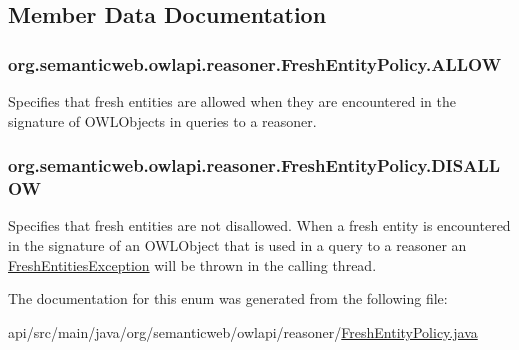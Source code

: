 \subsection{Member Data Documentation}
\hypertarget{enumorg_1_1semanticweb_1_1owlapi_1_1reasoner_1_1_fresh_entity_policy_a8f3d06d4ac09dbdb0e9d8da43e06cfc5}{
\subsubsection[{A\-L\-L\-O\-W}]{\setlength{\rightskip}{0pt plus 5cm}org.\-semanticweb.\-owlapi.\-reasoner.\-Fresh\-Entity\-Policy.\-A\-L\-L\-O\-W}}\label{enumorg_1_1semanticweb_1_1owlapi_1_1reasoner_1_1_fresh_entity_policy_a8f3d06d4ac09dbdb0e9d8da43e06cfc5}
Specifies that fresh entities are allowed when they are encountered in the signature of O\-W\-L\-Objects in queries to a reasoner. \hypertarget{enumorg_1_1semanticweb_1_1owlapi_1_1reasoner_1_1_fresh_entity_policy_a762eae6d5b2449d125311ecaabfdc8d0}{
\subsubsection[{D\-I\-S\-A\-L\-L\-O\-W}]{\setlength{\rightskip}{0pt plus 5cm}org.\-semanticweb.\-owlapi.\-reasoner.\-Fresh\-Entity\-Policy.\-D\-I\-S\-A\-L\-L\-O\-W}}\label{enumorg_1_1semanticweb_1_1owlapi_1_1reasoner_1_1_fresh_entity_policy_a762eae6d5b2449d125311ecaabfdc8d0}
Specifies that fresh entities are not disallowed. When a fresh entity is encountered in the signature of an O\-W\-L\-Object that is used in a query to a reasoner an \hyperlink{classorg_1_1semanticweb_1_1owlapi_1_1reasoner_1_1_fresh_entities_exception}{Fresh\-Entities\-Exception} will be thrown in the calling thread. 

The documentation for this enum was generated from the following file\-:\begin{DoxyCompactItemize}
\item 
api/src/main/java/org/semanticweb/owlapi/reasoner/\hyperlink{_fresh_entity_policy_8java}{Fresh\-Entity\-Policy.\-java}\end{DoxyCompactItemize}
